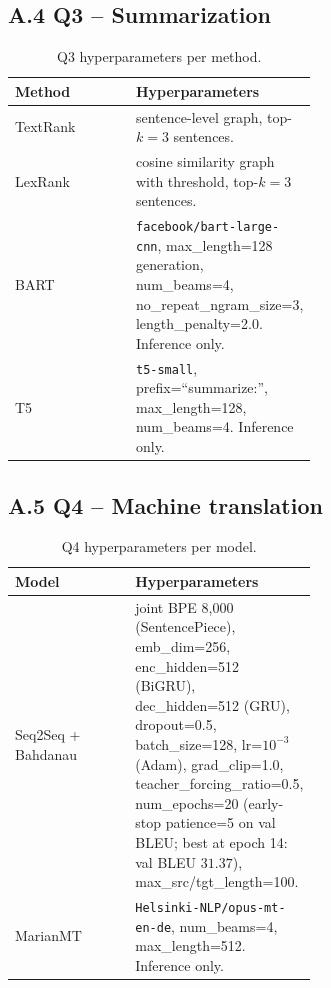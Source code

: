 \documentclass[12pt, a4paper]{article}
\begin{document}
\subsection*{A.4 Q3 -- Summarization}
\begin{table}[H]
\centering
\caption{Q3 hyperparameters per method.}
\begin{tabular}{lp{0.6\linewidth}}
\toprule
\textbf{Method} & \textbf{Hyperparameters} \\
\midrule
TextRank   & sentence-level graph, top-$k=3$ sentences. \\
LexRank    & cosine similarity graph with threshold, top-$k=3$ sentences. \\
BART       & \texttt{facebook/bart-large-cnn}, max\_length=128 generation, num\_beams=4, no\_repeat\_ngram\_size=3, length\_penalty=2.0. Inference only. \\
T5         & \texttt{t5-small}, prefix=``summarize:'', max\_length=128, num\_beams=4. Inference only. \\
\bottomrule
\end{tabular}
\end{table}

\subsection*{A.5 Q4 -- Machine translation}
\begin{table}[H]
\centering
\caption{Q4 hyperparameters per model.}
\begin{tabular}{lp{0.6\linewidth}}
\toprule
\textbf{Model} & \textbf{Hyperparameters} \\
\midrule
Seq2Seq + Bahdanau & joint BPE 8{,}000 (SentencePiece), emb\_dim=256, enc\_hidden=512 (BiGRU), dec\_hidden=512 (GRU), dropout=0.5, batch\_size=128, lr=$10^{-3}$ (Adam), grad\_clip=1.0, teacher\_forcing\_ratio=0.5, num\_epochs=20 (early-stop patience=5 on val BLEU; best at epoch 14: val BLEU $31.37$), max\_src/tgt\_length=100. \\
MarianMT          & \texttt{Helsinki-NLP/opus-mt-en-de}, num\_beams=4, max\_length=512. Inference only. \\
\bottomrule
\end{tabular}
\end{table}
\end{document}
